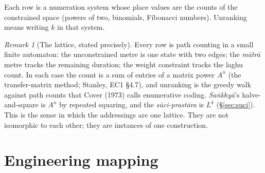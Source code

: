 \documentclass[11pt,letterpaper]{article}
\newcommand{\skt}[1]{\textit{#1}}
\theoremstyle{plain}
\theoremstyle{remark}
\newtheorem*{remark}{Remark}
\begin{document}
\medskip
Each row is a numeration system whose place values are the counts of the constrained space (powers of two, binomials, Fibonacci numbers). Unranking means writing $k$ in that system.

\begin{remark}[The lattice, stated precisely]
Every row is path counting in a small finite automaton: the unconstrained metre is one state with two edges; the \skt{mātrā} metre tracks the remaining duration; the weight constraint tracks the laghu count. In each case the count is a sum of entries of a matrix power $A^n$ (the transfer-matrix method; Stanley, EC1 §4.7), and unranking is the greedy walk against path counts that Cover (1973) calls enumerative coding. \skt{Saṅkhyā}'s halve-and-square is $A^n$ by repeated squaring, and the \skt{sūci-prastāra} is $L^k$ (§\ref{sec:suci}). This is the sense in which the addressings are one lattice. They are not isomorphic to each other; they are instances of one construction.
\end{remark}

\clearpage
\section{Engineering mapping}\label{sec:eng}
\end{document}

